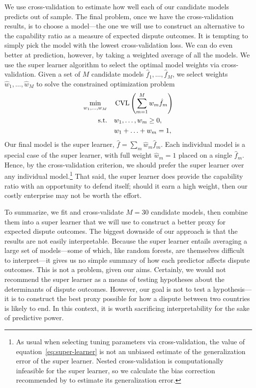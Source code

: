 We use cross-validation to estimate how well each of our candidate models predicts out of sample.
The final problem, once we have the cross-validation results, is to choose a model---the one we will use to construct an alternative to the capability ratio as a measure of expected dispute outcomes.
It is tempting to simply pick the model with the lowest cross-validation loss.
We can do even better at prediction, however, by taking a weighted average of all the models.
We use the super learner algorithm \citep{vanderLaan:bz} to select the optimal model weights via cross-validation.
Given a set of $M$ candidate models $\hat{f}_1, \ldots, \hat{f}_M$, we select weights $\hat{w}_1, \ldots, \hat{w}_M$ to solve the constrained optimization problem
\begin{equation}
  \label{eq:super-learner}
  \begin{aligned}
    \min_{w_1, \ldots, w_M}
    &\quad
    \operatorname{CVL} \left(
      \sum_{m=1}^M w_m \hat{f}_m
    \right)
    \\
    \mbox{s.t.}
    &\quad
    w_1, \ldots, w_m \geq 0,
    \\
    &\quad
    w_1 + \ldots + w_m = 1,
  \end{aligned}
\end{equation}
Our final model is the super learner, $\hat{f} = \sum_m \hat{w}_m \hat{f}_m$.
Each individual model is a special case of the super learner, with full weight $\hat{w}_m = 1$ placed on a single $\hat{f}_m$.
Hence, by the cross-validation criterion, we should prefer the super learner over any individual model.\footnote{%
  \label{fn:sl-bias}
  As usual when selecting tuning parameters via cross-validation, the value of equation~\eqref{eq:super-learner} is not an unbiased estimate of the generalization error of the super learner.
  Nested cross-validation is computationally infeasible for the super learner, so we calculate the bias correction recommended by \citet{Tibshirani:2009tz} to estimate its generalization error.
}  That said, the super learner does provide the capability ratio with an opportunity to defend itself; should it earn a high weight, then our costly enterprise may not be worth the effort.

To summarize, we fit and cross-validate $M = 30$ candidate models, then combine them into a super learner that we will use to construct a better proxy for expected dispute outcomes.
The biggest downside of our approach is that the results are not easily interpretable.
Because the super learner entails averaging a large set of models---some of which, like random forests, are themselves difficult to interpret---it gives us no simple summary of how each predictor affects dispute outcomes.
This is not a problem, given our aims.
Certainly, we would not recommend the super learner as a means of testing hypotheses about the determinants of dispute outcomes.
However, our goal is not to test a hypothesis---it is to construct the best proxy possible for how a dispute between two countries is likely to end.
In this context, it is worth sacrificing interpretability for the sake of predictive power.

